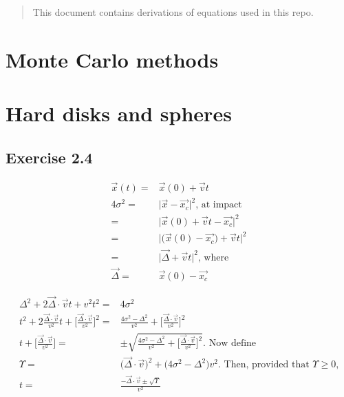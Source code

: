 \documentclass[]{article}
\title{}
\author{}
\begin{document}
\maketitle

\begin{abstract}
This document contains derivations of equations used in this repo.
\end{abstract}
\tableofcontents
\listoffigures
\section{Monte Carlo methods}

\section{Hard disks and spheres}

\subsection{Exercise 2.4}
\begin{align*}
	\vec{x}(t) =& \vec{x}(0)+\vec{v}t\\
	4\sigma^2 =& \vert \vec{x} - \vec{x_c} \vert^2 \text{, at impact}\\
	=& \vert \vec{x}(0)+\vec{v}t  - \vec{x_c}\vert^2\\
	=& \vert \big(\vec{x}(0)- \vec{x_c}\big)+\vec{v}t  \vert^2\\
	=& \vert \vec{\Delta}+\vec{v}t   \vert^2 \text{, where }\\
	\vec{\Delta} =&\vec{x}(0)- \vec{x_c}
\end{align*}

\begin{align*}
	\Delta^2 + 2 \vec{\Delta}\cdot\vec{v}t + v^2t^2 =& 4\sigma^2\\
	t^2 + 2\frac{\vec{\Delta}\cdot\vec{v}}{v^2}t + \big[\frac{\vec{\Delta}\cdot\vec{v}}{v^2}\big]^2=& \frac{ 4\sigma^2 - \Delta^2}{v^2}  + \big[\frac{\vec{\Delta}\cdot\vec{v}}{v^2}\big]^2\\
	t + \big[\frac{\vec{\Delta}\cdot\vec{v}}{v^2}\big]=& \pm \sqrt{\frac{ 4\sigma^2 - \Delta^2}{v^2}  + \big[\frac{\vec{\Delta}\cdot\vec{v}}{v^2}\big]^2} \text{. Now define} \\
	\Upsilon =&\big( \vec{\Delta}\cdot\vec{v}\big)^2 +  \big(4\sigma^2 - \Delta^2\big) v^2 \text{. Then, provided that $\Upsilon\ge 0$,}\\
	t=&\frac{-\vec{\Delta}\cdot\vec{v} \pm \sqrt{\Upsilon}}{v^2}
\end{align*}

\begin{figure}[H]
\begin{center}
\end{center}

\end{figure}
\end{document}
